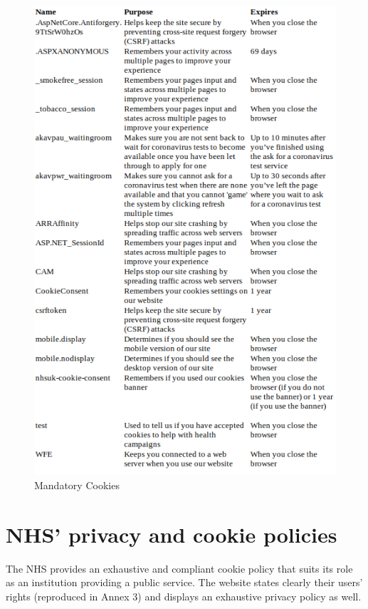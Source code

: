 \documentclass[twocolumn, letterpaper,13pt]{scrartcl}
\begin{document}
    \begin{figure}	\includegraphics[width=0.98\linewidth]{mandatory_cookies.png}
    \caption{Mandatory Cookies\label{fig:b}}
    \end{figure}

	\section{NHS' privacy and cookie policies}
	
	    The NHS provides an exhaustive and compliant cookie policy that suits its role as an institution providing a public service. The website states clearly their users' rights\cite{gdprfurther} (reproduced in Annex 3) and displays an exhaustive privacy policy as well.
	    
\end{document}
